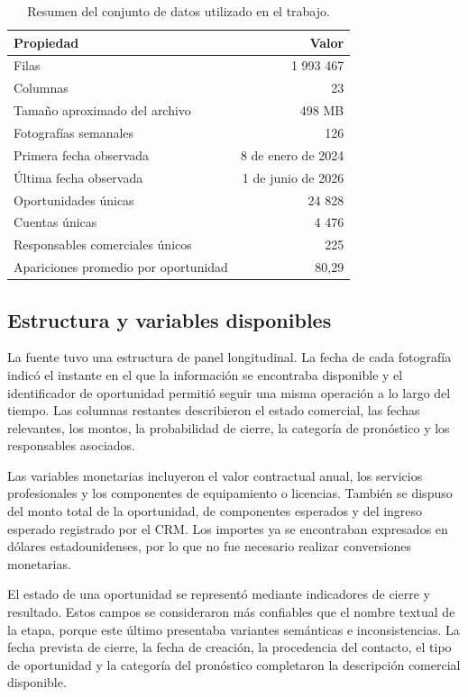 \begin{table}[ht]
    \centering
    \caption{Resumen del conjunto de datos utilizado en el trabajo.}
    \label{tab:resumenFuente}
    \small
    \begin{tabular}{p{7.2cm} r}
        \toprule
        Propiedad & Valor \\
        \midrule
        Filas & 1 993 467 \\
        Columnas & 23 \\
        Tamaño aproximado del archivo & 498 MB \\
        Fotografías semanales & 126 \\
        Primera fecha observada & 8 de enero de 2024 \\
        Última fecha observada & 1 de junio de 2026 \\
        Oportunidades únicas & 24 828 \\
        Cuentas únicas & 4 476 \\
        Responsables comerciales únicos & 225 \\
        Apariciones promedio por oportunidad & 80,29 \\
        \bottomrule
    \end{tabular}
\end{table}

\subsection{Estructura y variables disponibles}

La fuente tuvo una estructura de panel longitudinal. La fecha de cada fotografía indicó el instante en el que la información se encontraba disponible y el identificador de oportunidad permitió seguir una misma operación a lo largo del tiempo. Las columnas restantes describieron el estado comercial, las fechas relevantes, los montos, la probabilidad de cierre, la categoría de pronóstico y los responsables asociados.

Las variables monetarias incluyeron el valor contractual anual, los servicios profesionales y los componentes de equipamiento o licencias. También se dispuso del monto total de la oportunidad, de componentes esperados y del ingreso esperado registrado por el CRM. Los importes ya se encontraban expresados en dólares estadounidenses, por lo que no fue necesario realizar conversiones monetarias.

El estado de una oportunidad se representó mediante indicadores de cierre y resultado. Estos campos se consideraron más confiables que el nombre textual de la etapa, porque este último presentaba variantes semánticas e inconsistencias. La fecha prevista de cierre, la fecha de creación, la procedencia del contacto, el tipo de oportunidad y la categoría del pronóstico completaron la descripción comercial disponible.

